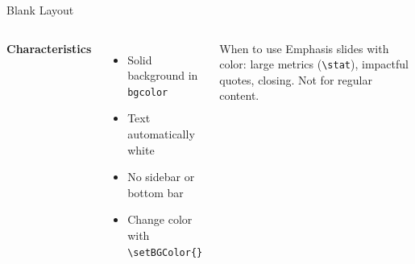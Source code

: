 \documentclass[aspectratio=169,t,xcolor=table]{beamer}
\begin{document}
\begin{frame}{Blank Layout}

    \begin{columns}
        \textbf{Characteristics}
        \begin{itemize}
            \item Solid background in \texttt{bgcolor}
            \item Text automatically white
            \item No sidebar or bottom bar
            \item Change color with \texttt{\textbackslash setBGColor\{\}}
        \end{itemize}

        \begin{block}{When to use}
            Emphasis slides with color: large metrics (\texttt{\textbackslash stat}), impactful quotes, closing. Not for regular content.
        \end{block}
    \end{columns}

\end{frame}
\end{document}
